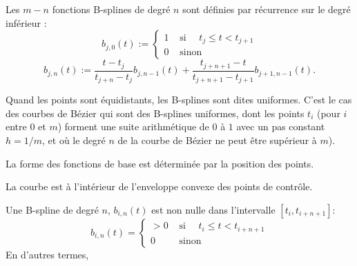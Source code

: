 \medskip
Les $m-n$ fonctions B-splines de degré $n$ sont définies par récurrence sur le degré inférieur :
\begin{equation}
    b_{j, 0}(t) := \left\{ \begin{matrix} 1 & \text{ si } \quad t_j \leqslant t < t_{j + 1} \\ 0 & \text{ sinon} \end{matrix} \right. 
\end{equation}
\begin{equation}
    b_{j, n}(t) := \frac{t - t_j}{t_{j + n} - t_j} b_{j, n - 1}(t) + \frac{t_{j + n + 1} - t}{t_{j + n + 1} - t_{j + 1}} b_{j + 1, n - 1}(t).
\end{equation}

Quand les points sont équidistants, les B-splines sont dites uniformes.
C'est le cas des courbes de Bézier qui sont des B-splines uniformes, dont les points $t_i$ (pour $i$ entre $0$ et 
$m$) forment une suite arithmétique de $0$ à $1$ avec un pas constant $h=1/m$, et où le degré $n$ 
de la courbe de Bézier ne peut être supérieur à $m$).

\medskip
{}

\medskip
La forme des fonctions de base est déterminée par la position des points.

La courbe est à l'intérieur de l'enveloppe convexe des points de contrôle.

Une B-spline de degré $n$, $b_{i,n}(t)$ est non nulle dans l'intervalle $[t_i, t_{i+n+1}]$:
\begin{equation}
    b_{i,n}(t) = \left\{\begin{matrix} >0 & \text{ si } \quad t_{i} \leqslant t < t_{i+n+1} \\ 0 & \text{ sinon } \end{matrix} \right. 
\end{equation}
En d'autres termes, 

